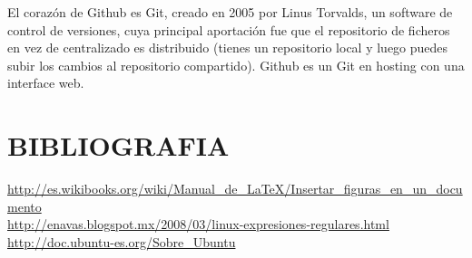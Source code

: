 \documentclass[12pt]{article}
\begin{document}
El corazón de Github es Git, creado en 2005 por Linus Torvalds, un software de control de versiones, cuya principal aportación fue que el repositorio de ficheros en vez de centralizado es distribuido (tienes un repositorio local y luego puedes subir los cambios al repositorio compartido). Github es un Git en hosting con una interface web.\\


\section{BIBLIOGRAFIA}

\begin{thebibliography}{101}

 \url {http://es.wikibooks.org/wiki/Manual_de_LaTeX/Insertar_figuras_en_un_documento}\\
\url {http://enavas.blogspot.mx/2008/03/linux-expresiones-regulares.html}\\
 \url {http://doc.ubuntu-es.org/Sobre_Ubuntu}\\
\end{thebibliography}
\end{document}
